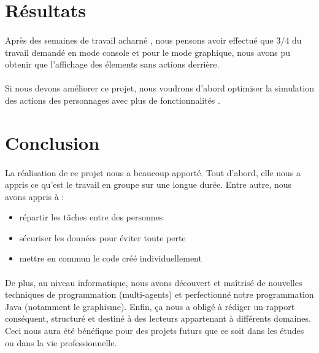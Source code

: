 \section{Résultats}
\paragraph{}Après des semaines de travail acharné , nous pensons avoir effectué que 3/4 du travail demandé en mode console et pour le mode graphique, nous avons pu obtenir que l'affichage des élements sans actions derrière.
\paragraph{}Si nous devons améliorer ce projet, nous voudrons d'abord optimiser la simulation des actions des personnages avec plus de fonctionnalités .

\section{Conclusion}
\paragraph{}La réalisation de ce projet nous a beaucoup apporté. Tout d’abord, elle nous a appris ce qu’est le travail en groupe sur une longue durée. Entre autre, nous avons appris à :
\begin{itemize}
\item{}répartir les tâches entre des personnes 
\item{}sécuriser les données pour éviter toute perte 
\item{}mettre en commun le code créé individuellement 
\end{itemize}
\paragraph{}De plus, au niveau informatique, nous avons découvert et maîtrisé de nouvelles techniques de programmation (multi-agents) et perfectionné notre programmation Java (notamment le graphisme). Enfin, ça nous a obligé à rédiger un rapport conséquent, structuré et destiné à des lecteurs appartenant à différents domaines. Ceci nous aura été bénéfique pour des projets futurs que ce soit dans les études ou dans la vie professionnelle.
